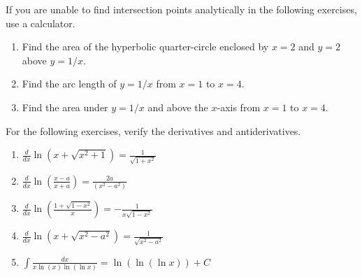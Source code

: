 \documentclass{exercises}
\begin{document}
If you are unable to find intersection points analytically in the following exercises, use a calculator.

\begin{enumerate}[resume]
\item Find the area of the hyperbolic quarter-circle enclosed by $x=2$ and $y=2$ above $y=1/x$.
\item \techrequired Find the arc length of $y=1/x$ from $x=1$ to $x=4$.
\item Find the area under $y=1/x$ and above the $x$-axis from $x=1$ to $x=4$.
\end{enumerate}

For the following exercises, verify the derivatives and antiderivatives.

\begin{enumerate}[resume]
\item $\frac{d}{dx}\ln(x+\sqrt{x^{2}+1})=\frac{1}{\sqrt{1+x^{2}}}$
\item $\frac{d}{dx}\ln(\frac{x-a}{x+a})=\frac{2a}{(x^{2}-a^{2})}$
\item $\frac{d}{dx}\ln(\frac{1+\sqrt{1-x^{2}}}{x})=-\frac{1}{x\sqrt{1-x^{2}}}$
\item $\frac{d}{dx}\ln(x+\sqrt{x^{2}-a^{2}})=\frac{1}{\sqrt{x^{2}-a^{2}}}$
\item $\int \frac{dx}{x\ln(x)\ln(\ln x)}=\ln(\ln(\ln x))+C$
\end{enumerate}
\end{document}
